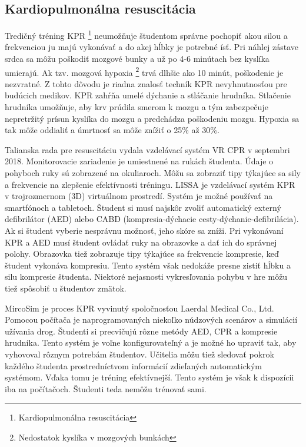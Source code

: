 \documentclass[10pt,twoside,slovak,a4paper]{article}
\begin{document}
\subsection{Kardiopulmonálna resuscitácia} \label{KPR}

Tredičný tréning KPR \footnote{Kardiopulmonálna resuscitácia} neumožňuje študentom správne pochopiť akou silou a frekvenciou ju majú vykonávať a do akej hĺbky je potrebné ísť. Pri náhlej zástave srdca sa môžu poškodiť mozgové bunky a už po 4-6 minútach bez kyslíka umierajú. Ak tzv. mozgová hypoxia \footnote{Nedostatok kyslíka v mozgových bunkách} trvá dlhšie ako 10 minút, poškodenie je nezvratné. Z tohto dôvodu je riadna znalosť techník KPR nevyhnutnosťou pre budúcich medikov. KPR zahŕňa umelé dýchanie a stláčanie hrudníka. Stlačenie hrudníka umožňuje, aby krv prúdila smerom k mozgu
a tým zabezpečuje nepretržitý prísun kyslíka do mozgu a predchádza poškodeniu mozgu. Hypoxia sa tak môže oddialiť a úmrtnosť sa môže znížiť o 25\% až 30\%. \cite{9130697}

Talianska rada pre resuscitáciu vydala vzdelávací systém VR CPR v septembri 2018. Monitorovacie zariadenie je umiestnené na rukách študenta. Údaje o pohyboch ruky sú zobrazené na okuliaroch. Môžu sa zobraziť tipy týkajúce sa sily a frekvencie na zlepšenie efektívnosti tréningu. LISSA je vzdelávací systém KPR v trojrozmernom (3D) virtuálnom prostredí. Systém je možné používať na smartfónoch a tabletoch. Študent si musí najskôr zvoliť automatický externý defibrilátor (AED) alebo CABD (kompresia-dýchacie cesty-dýchanie-defibrilácia). Ak si študent vyberie nesprávnu možnosť, jeho skóre sa zníži. Pri vykonávaní KPR a AED musí študent ovládať ruky na obrazovke a dať ich do správnej polohy. Obrazovka tiež zobrazuje tipy týkajúce sa frekvencie kompresie, keď študent vykonáva kompresiu. Tento systém však nedokáže presne zistiť hĺbku a silu kompresie študenta. Niektoré nejasnosti vykresľovania pohybu v hre môžu tiež spôsobiť u študentov zmätok. \cite{9130697}

MircoSim je proces KPR vyvinutý spoločnosťou Laerdal Medical Co., Ltd. Pomocou počítača je naprogramovaných niekoľko núdzových scenárov a simulácií užívania drog. Študenti si precvičujú rôzne metódy AED, CPR a kompresie hrudníka. Tento systém je voľne konfigurovateľný a je možné ho upraviť tak, aby vyhovoval rôznym potrebám študentov. Učitelia môžu tiež
sledovať pokrok každého študenta prostredníctvom informácií zdieľaných automatickým systémom. Vďaka tomu je tréning efektívnejší. Tento systém je však k dispozícii iba na počítačoch. Študenti teda nemôžu trénovať sami. \cite{9130697}
\end{document}
